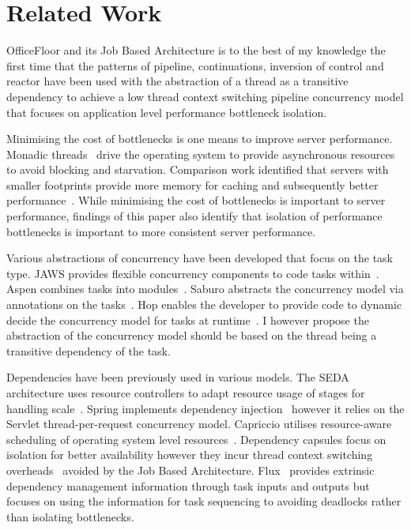 \documentclass[conference]{ieee/IEEEtran}
\begin{document}
\section{Related Work}
OfficeFloor and its Job Based Architecture is to the best of my knowledge the
first time that the patterns of pipeline, continuations, inversion of control
and reactor have been used with the abstraction of a thread as a transitive
dependency to achieve a low thread context switching pipeline concurrency model
that focuses on application level performance bottleneck isolation.

Minimising the cost of bottlenecks is one means to improve server performance.
 Monadic threads~\cite{monadic-thread} drive the operating system to provide
asynchronous resources to avoid blocking and starvation.  Comparison work
identified that servers with smaller footprints provide more memory for caching
and subsequently better performance~\cite{low-server-footprint}.  While
minimising the cost of bottlenecks is important to server performance, findings
of this paper also identify that isolation of performance bottlenecks is
important to more consistent server performance.

Various abstractions of concurrency have been developed that focus on the task
type.  JAWS provides flexible concurrency components to code tasks
within~\cite{jaws}.  Aspen combines tasks into modules~\cite{aspen}.  Saburo
abstracts the concurrency model via annotations on the tasks~\cite{saburo}.  Hop
enables the developer to provide code to dynamic decide the concurrency model
for tasks at runtime~\cite{hop}.  I however propose the abstraction of the
concurrency model should be based on the thread being a transitive dependency of
the task.

Dependencies have been previously used in various models.  The SEDA architecture
uses resource controllers to adapt resource usage of stages for handling
scale~\cite{seda}.  Spring implements dependency injection~\cite{ioc} however it
relies on the Servlet thread-per-request concurrency model.  Capriccio utilises
resource-aware scheduling of operating system level resources~\cite{capriccio}.
Dependency capsules focus on isolation for better availability however they
incur thread context switching overheads~\cite{dependency-capsules} avoided by
the Job Based Architecture.  Flux~\cite{flux} provides extrinsic dependency
management information through task inputs and outputs but focuses on using the
information for task sequencing to avoiding deadlocks rather than isolating
bottlenecks.
\end{document}
